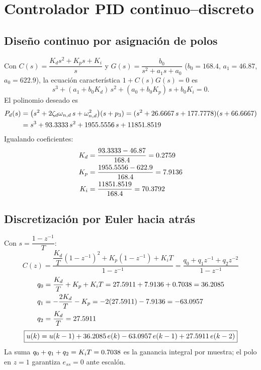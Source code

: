 \documentclass[11pt,letterpaper]{article}
\begin{document}
\section{Controlador PID continuo--discreto}

\subsection{Diseño continuo por asignación de polos}
Con $C(s) = \dfrac{K_d s^2 + K_p s + K_i}{s}$ y
$G(s) = \dfrac{b_0}{s^2 + a_1 s + a_0}$ ($b_0=168.4$, $a_1=46.87$, $a_0=622.9$),
la ecuación característica $1 + C(s)G(s) = 0$ es
\begin{equation}
  s^3 + (a_1 + b_0 K_d)\,s^2 + (a_0 + b_0 K_p)\,s + b_0 K_i = 0 .
\end{equation}
El polinomio deseado es
\begin{align}
  P_d(s) &= \bigl(s^2 + 2\zeta_d\omega_{n,d}\,s + \omega_{n,d}^2\bigr)(s + p_3)
  = (s^2 + 26.6667\,s + 177.7778)(s + 66.6667) \nonumber\\
  &= s^3 + 93.3333\,s^2 + 1955.5556\,s + 11851.8519
\end{align}
Igualando coeficientes:
\begin{align}
  K_d &= \frac{93.3333 - 46.87}{168.4} = 0.2759\\
  K_p &= \frac{1955.5556 - 622.9}{168.4} = 7.9136\\
  K_i &= \frac{11851.8519}{168.4} = 70.3792
\end{align}

\subsection{Discretización por Euler hacia atrás}
Con $s = \dfrac{1 - z^{-1}}{T}$:
\begin{equation}
  C(z) = \frac{\dfrac{K_d}{T}(1-z^{-1})^2 + K_p(1-z^{-1}) + K_i T}{1 - z^{-1}}
       = \frac{q_0 + q_1 z^{-1} + q_2 z^{-2}}{1 - z^{-1}}
\end{equation}
\begin{align}
  q_0 &= \frac{K_d}{T} + K_p + K_i T = 27.5911 + 7.9136 + 0.7038 = 36.2085\\
  q_1 &= -\frac{2K_d}{T} - K_p = -2(27.5911) - 7.9136 = -63.0957\\
  q_2 &= \frac{K_d}{T} = 27.5911
\end{align}
\begin{equation}
  \boxed{u(k) = u(k-1) + 36.2085\,e(k) -63.0957\,e(k-1) + 27.5911\,e(k-2)}
\end{equation}
La suma $q_0+q_1+q_2 = K_i T = 0.7038$ es la ganancia integral por muestra; el
polo en $z=1$ garantiza $e_{ss}=0$ ante escalón.
\end{document}
